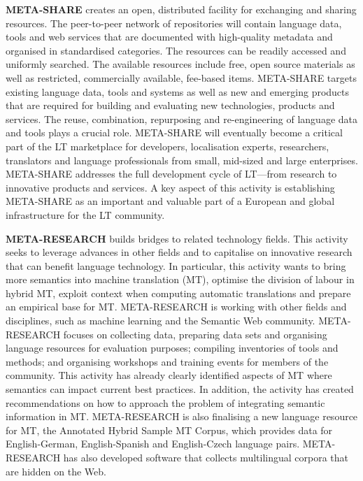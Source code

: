 \documentclass[]{../../metanetpaper}
\begin{document}
\begin{Parallel}[c]{79mm}{78mm}
{    \textbf{META-SHARE} creates an open, distributed facility for exchanging and sharing resources. The peer-to-peer network of repositories will contain language data, tools and web services that are documented with high-quality metadata and organised in standardised categories. The resources can be readily accessed and uniformly searched. The available resources include free, open source materials as well as restricted, commercially available, fee-based items. META-SHARE targets existing language data, tools and systems as well as new and emerging products that are required for building and evaluating new technologies, products and services. The reuse, combination, repurposing and re-engineering of language data and tools plays a crucial role. META-SHARE will eventually become a critical part of the LT marketplace for developers, localisation experts, researchers, translators and language professionals from small, mid-sized and large enterprises. META-SHARE addresses the full development cycle of LT—from research to innovative products and services. A key aspect of this activity is establishing META-SHARE as an important and valuable part of a European and global infrastructure for the LT community. 

    \textbf{META-RESEARCH} builds bridges to related technology fields. This activity seeks to leverage advances in other fields and to capitalise on innovative research that can benefit language technology. In particular, this activity wants to bring more semantics into machine translation (MT), optimise the division of labour in hybrid MT, exploit context when computing automatic translations and prepare an empirical base for MT. META-RESEARCH is working with other fields and disciplines, such as machine learning and the Semantic Web community. META-RESEARCH focuses on collecting data, preparing data sets and organising language resources for evaluation purposes; compiling inventories of tools and methods; and organising workshops and training events for members of the community. This activity has already clearly identified aspects of MT where semantics can impact current best practices. In addition, the activity has created recommendations on how to approach the problem of integrating semantic information in MT. META-RESEARCH is also finalising a new language resource for MT, the Annotated Hybrid Sample MT Corpus, which provides data for English-German, English-Spanish and English-Czech language pairs. META-RESEARCH has also developed software that collects multilingual corpora that are hidden on the Web.
  }


\end{Parallel}
\end{document}
